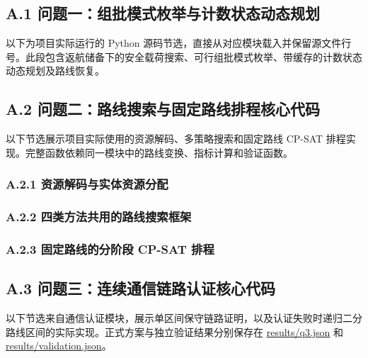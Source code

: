 \subsection*{A.1 问题一：组批模式枚举与计数状态动态规划}
以下为项目实际运行的 Python 源码节选，直接从对应模块载入并保留源文件行号。此段包含返航储备下的安全载荷搜索、可行组批模式枚举、带缓存的计数状态动态规划及路线恢复。


\clearpage
\subsection*{A.2 问题二：路线搜索与固定路线排程核心代码}
以下节选展示项目实际使用的资源解码、多策略搜索和固定路线 CP-SAT 排程实现。完整函数依赖同一模块中的路线变换、指标计算和验证函数。

\subsubsection*{A.2.1 资源解码与实体资源分配}


\clearpage
\subsubsection*{A.2.2 四类方法共用的路线搜索框架}


\clearpage
\subsubsection*{A.2.3 固定路线的分阶段 CP-SAT 排程}


\clearpage
\subsection*{A.3 问题三：连续通信链路认证核心代码}
以下节选来自通信认证模块，展示单区间保守链路证明，以及认证失败时递归二分路线区间的实际实现。正式方案与独立验证结果分别保存在 \url{results/q3.json} 和 \url{results/validation.json}。

